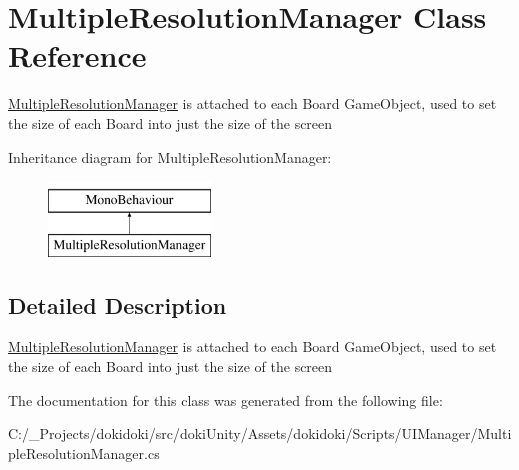 \hypertarget{class_multiple_resolution_manager}{}\section{Multiple\+Resolution\+Manager Class Reference}
\label{class_multiple_resolution_manager}


\hyperlink{class_multiple_resolution_manager}{Multiple\+Resolution\+Manager} is attached to each Board Game\+Object, used to set the size of each Board into just the size of the screen  


Inheritance diagram for Multiple\+Resolution\+Manager\+:\begin{figure}[H]
\begin{center}
\leavevmode
\includegraphics[height=2.000000cm]{class_multiple_resolution_manager}
\end{center}
\end{figure}


\subsection{Detailed Description}
\hyperlink{class_multiple_resolution_manager}{Multiple\+Resolution\+Manager} is attached to each Board Game\+Object, used to set the size of each Board into just the size of the screen 



The documentation for this class was generated from the following file\+:\begin{DoxyCompactItemize}
\item 
C\+:/\+\_\+\+Projects/dokidoki/src/doki\+Unity/\+Assets/dokidoki/\+Scripts/\+U\+I\+Manager/Multiple\+Resolution\+Manager.\+cs\end{DoxyCompactItemize}
